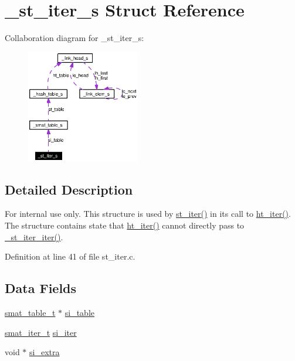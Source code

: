 \hypertarget{struct__st__iter__s}{
\section{\_\-st\_\-iter\_\-s Struct Reference}
\label{struct__st__iter__s}
}
Collaboration diagram for \_\-st\_\-iter\_\-s:\begin{figure}[H]
\begin{center}
\leavevmode
\includegraphics[width=140pt]{struct__st__iter__s__coll__graph}
\end{center}
\end{figure}


\subsection{Detailed Description}
\begin{Desc}
\item[For internal use only.]
This structure is used by \hyperlink{group__dbprim__smat_ga14}{st\_\-iter()} in its call to \hyperlink{group__dbprim__hash_ga15}{ht\_\-iter()}. The structure contains state that \hyperlink{group__dbprim__hash_ga15}{ht\_\-iter()} cannot directly pass to \hyperlink{group__dbprim__smat_ga31}{\_\-st\_\-iter\_\-iter()}.\end{Desc}




Definition at line 41 of file st\_\-iter.c.\subsection*{Data Fields}
\begin{CompactItemize}
\item 
\hyperlink{struct__smat__table__s}{smat\_\-table\_\-t} $\ast$ \hyperlink{struct__st__iter__s_o0}{si\_\-table}
\item 
\hyperlink{group__dbprim__smat_ga4}{smat\_\-iter\_\-t} \hyperlink{struct__st__iter__s_o1}{si\_\-iter}
\item 
void $\ast$ \hyperlink{struct__st__iter__s_o2}{si\_\-extra}
\end{CompactItemize}


